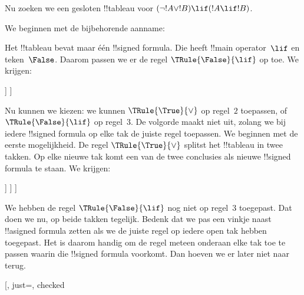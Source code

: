 \documentclass[../../../include/open-logic-section]{subfiles}
\begin{document}
\begin{ex}
Nu zoeken we een gesloten !!{tableau} voor
$(\lnot !A \lor !B) \lif (!A \lif !B)$.

We beginnen met de bijbehorende aanname:
\begin{oltableau}
  [\sFmla{\False}{(\lnot \formula{A} \lor \formula{B}) \lif
      (\formula{A} \lif \formula{B})}, just=\TAss]
\end{oltableau}
Het !!{tableau} bevat maar één !!{signed formula}. Die heeft
!!{main operator}~$\lif$ en teken~$\False$. Daarom passen we er de regel
$\TRule{\False}{\lif}$ op toe. We krijgen:
\begin{oltableau}
  [\sFmla{\False}{(\lnot \formula{A} \lor \formula{B})
      \lif (\formula{A} \lif \formula{B})}, just=\TAss, checked
    [\sFmla{\True}{\lnot \formula{A} \lor \formula{B}},
      just={\TRule{\False}{\lif}[1]}
      [\sFmla{\False}{(\formula{A} \lif \formula{B})},
        just={\TRule{\False}{\lif}[1]}
      ]
    ]
  ]
\end{oltableau}
Nu kunnen we kiezen: we kunnen $\TRule{\True}{\lor}$ op regel~$2$
toepassen, of $\TRule{\False}{\lif}$ op regel~$3$. De volgorde maakt
niet uit, zolang we bij iedere !!{signed formula} op elke tak de juiste
regel toepassen. We beginnen met de eerste mogelijkheid. De regel
$\TRule{\True}{\lor}$ splitst het !!{tableau} in twee takken. Op elke
nieuwe tak komt een van de twee conclusies als nieuwe !!{signed formula}
te staan. We krijgen:
\begin{oltableau}
  [\sFmla{\False}{(\lnot \formula{A} \lor \formula{B}) \lif
      (\formula{A} \lif \formula{B})}, just=\TAss, checked
    [\sFmla{\True}{\lnot \formula{A} \lor \formula{B}},
      just={\TRule{\False}{\lif}[1]}, checked
      [\sFmla{\False}{(\formula{A} \lif \formula{B})},
        just={\TRule{\False}{\lif}[1]}
        [\sFmla{\True}{\lnot \formula{A}}, just={\TRule{\True}{\lor}[2]}]
        [\sFmla{\True}{\formula{B}}, just={\TRule{\True}{\lor}[2]}]
      ]
    ]
  ]
\end{oltableau}
We hebben de regel $\TRule{\False}{\lif}$ nog niet op regel~$3$
toegepast. Dat doen we nu, op beide takken tegelijk. Bedenk dat we pas
een vinkje naast !!a{signed formula} zetten als we de juiste regel op
iedere open tak hebben toegepast. Het is daarom handig om de regel
meteen onderaan elke tak toe te passen waarin die !!{signed formula}
voorkomt. Dan hoeven we er later niet naar terug.
\begin{oltableau}
  [, just=\TAss, checked

\end{oltableau}
\end{ex}
\end{document}

